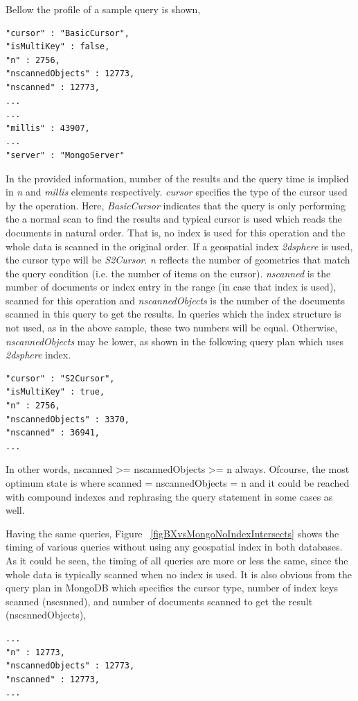 \documentclass[a4paper,12pt]{article}
\begin{document}
Bellow the profile of a sample query is shown,

\begin{verbatim}
"cursor" : "BasicCursor",
"isMultiKey" : false,
"n" : 2756,
"nscannedObjects" : 12773,
"nscanned" : 12773,
...
...
"millis" : 43907,
...
"server" : "MongoServer"
\end{verbatim}

In the provided information, number of the results and the query time is implied in \textit{n} and \textit{millis} elements respectively. \textit{cursor} specifies the type of the cursor used by the operation. Here, \textit{BasicCursor} indicates that the query is only performing the a normal scan to find the results and typical cursor is used which reads the documents in natural order. That is, no index is used for this operation and the whole data is scanned in the original order. If a geospatial index \textit{2dsphere} is used, the cursor type will be \textit{S2Cursor}. \textit{n} reflects the number of geometries that match the query condition (i.e. the number of items on the cursor). \textit{nscanned} is the number of documents or index entry in the range (in case that index is used), scanned for this operation and \textit{nscannedObjects} is the number of the documents scanned in this query to get the results. In queries which the index structure is not used, as in the above sample, these two numbers will be equal. Otherwise, \textit{nscannedObjects} may be lower, as shown in the following query plan which uses \textit{2dsphere} index. 

\begin{verbatim}
"cursor" : "S2Cursor",
"isMultiKey" : true,
"n" : 2756,
"nscannedObjects" : 3370,
"nscanned" : 36941,
...
\end{verbatim}

In other words, nscanned >= nscannedObjects >= n always. Ofcourse, the most optimum state is where scanned = nscannedObjects = n and it could be reached with compound indexes and rephrasing the query statement in some cases as well.

Having the same queries, Figure ~\ref{figBXvsMongoNoIndexIntersects} shows the timing of various queries without using any geospatial index in both databases. As it could be seen, the timing of all queries are more or less the same, since the whole data is typically scanned when no index is used. It is also obvious from the query plan in MongoDB which specifies the cursor type, number of index keys scanned (nscsnned), and number of documents scanned to get the result (nscsnnedObjects),
\begin{verbatim}
...
"n" : 12773,
"nscannedObjects" : 12773,
"nscanned" : 12773,
...
\end{verbatim}
\end{document}
